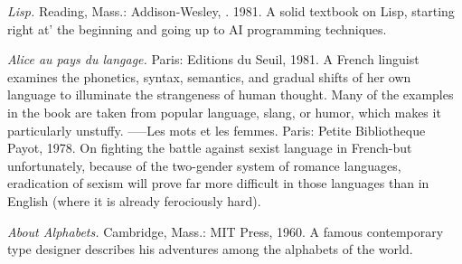 {\sl Lisp.} Reading, Mass.: Addison-Wesley, . 1981. A solid textbook on Lisp, starting right at' the beginning and going up to AI programming techniques.

 {\sl Alice au pays du langage.} Paris: Editions du Seuil, 1981. A French linguist examines the phonetics, syntax, semantics, and gradual shifts of her own language to illuminate the strangeness of human thought. Many of the examples in the book are taken from popular language, slang, or humor, which makes it particularly unstuffy. -----Les mots et les femmes. Paris: Petite Bibliotheque Payot, 1978. On fighting the battle against sexist language in French-but unfortunately, because of the two-gender system of romance languages, eradication of sexism will prove far more difficult in those languages than in English (where it is already ferociously hard).

 {\sl About Alphabets.} Cambridge, Mass.: MIT Press, 1960. A famous contemporary type designer describes his adventures among the alphabets of the world.
